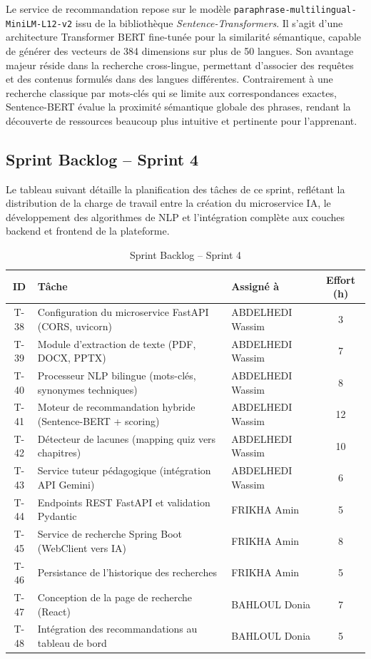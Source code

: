 Le service de recommandation repose sur le modèle \texttt{paraphrase-multilingual-MiniLM-L12-v2} issu de la bibliothèque \textit{Sentence-Transformers}. Il s'agit d'une architecture Transformer BERT fine-tunée pour la similarité sémantique, capable de générer des vecteurs de 384 dimensions sur plus de 50 langues. Son avantage majeur réside dans la recherche cross-lingue, permettant d'associer des requêtes et des contenus formulés dans des langues différentes. Contrairement à une recherche classique par mots-clés qui se limite aux correspondances exactes, Sentence-BERT évalue la proximité sémantique globale des phrases, rendant la découverte de ressources beaucoup plus intuitive et pertinente pour l'apprenant.

\subsection{Sprint Backlog -- Sprint 4}

Le tableau suivant détaille la planification des tâches de ce sprint, reflétant la distribution de la charge de travail entre la création du microservice IA, le développement des algorithmes de NLP et l'intégration complète aux couches backend et frontend de la plateforme.

\begin{table}[H]
\centering
\renewcommand{\arraystretch}{1.3}
\caption{Sprint Backlog -- Sprint 4}
\vspace{0.2cm}
\begin{tabularx}{\textwidth}{c X l c}
\toprule
\textbf{ID} & \textbf{Tâche} & \textbf{Assigné à} & \textbf{Effort (h)} \\
\midrule
T-38 & Configuration du microservice FastAPI (CORS, uvicorn) & ABDELHEDI Wassim & 3 \\
T-39 & Module d'extraction de texte (PDF, DOCX, PPTX) & ABDELHEDI Wassim & 7 \\
T-40 & Processeur NLP bilingue (mots-clés, synonymes techniques) & ABDELHEDI Wassim & 8 \\
T-41 & Moteur de recommandation hybride (Sentence-BERT + scoring) & ABDELHEDI Wassim & 12 \\
T-42 & Détecteur de lacunes (mapping quiz vers chapitres) & ABDELHEDI Wassim & 10 \\
T-43 & Service tuteur pédagogique (intégration API Gemini) & ABDELHEDI Wassim & 6 \\
T-44 & Endpoints REST FastAPI et validation Pydantic & FRIKHA Amin & 5 \\
T-45 & Service de recherche Spring Boot (WebClient vers IA) & FRIKHA Amin & 8 \\
T-46 & Persistance de l'historique des recherches & FRIKHA Amin & 5 \\
T-47 & Conception de la page de recherche (React) & BAHLOUL Donia & 7 \\
T-48 & Intégration des recommandations au tableau de bord & BAHLOUL Donia & 5 \\
\bottomrule
\end{tabularx}
\end{table}


